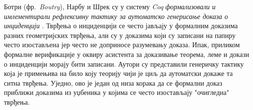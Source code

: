 Ботри (фр.~\emph{Boutry}), Нарбу и Шрек су у систему \emph{Coq}
\emph{формализовали и имлементирали рефлексивну тактику за аутоматско
  генерисање доказа о инциденцији} \cite{boutry2015reflexive}. Тврђења
о инциденцији се често јављају у формалним доказима разних
геометријских тврђења, али су у доказима који су записани на папиру
често изостављена јер често не доприносе разумевању доказа. Ипак,
приликом формалне верификације у оквиру асистента за доказивање
теорема, леме и докази о инциденцији морају бити записани. Аутори су
представили генеричку тактику која је примењива на било коју теорију
чији је циљ да аутоматски докаже та ситна тврђења. Уједно, ово је
један од низа корака да се формални доказ приближи доказима из
уџбеника у којима се често изостављају "очигледна" тврђења.




























